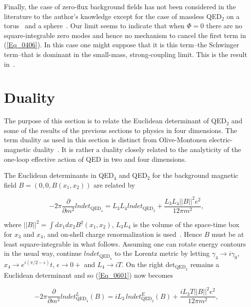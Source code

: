 \documentclass[a4paper,twocolumn,showpacs,preprintnumbers,amsmath,amssymb]{revtex4}
\newcommand{\pdo}[1]{\ensuremath{\frac{\partial }
        {\partial #1 }}}
\begin{document}
Finally, the case of zero-flux background fields has not been
considered in the literature to the author's knowledge except for the
case of massless QED$_2$ on a torus~\cite{Sachs92} and a
sphere~\cite{Jayewardena88}. Our limit seems to indicate that when
$\Phi = 0$ there are no square-integrable zero modes and hence no
mechanism to cancel the first term in (\ref{Eq_0406}).  In this case
one might suppose that it is this term--the Schwinger term--that is
dominant in the small-mass, strong-coupling limit. This is the result
in~\cite{Sachs92}.



\section{\label{Sec_SecVI}
Duality}

The purpose of this section is to relate the Euclidean determinant of
QED$_2$ and some of the results of the previous sections to physics in
four dimensions. The term duality as used in this section is distinct
from Olive-Montonen electric-magnetic duality~\cite{Montonen77}. It is
rather a duality closely related to the analyticity of the one-loop
effective action of QED in two and four dimensions.

The Euclidean determinants in QED$_4$ and QED$_2$ for the background
magnetic field $B = (0,0,B(x_1, x_2))$ are related by

\begin{widetext}
\begin{equation}
\label{Eq_0601}
-2\pi \pdo{m^2} lndet_{\text{QED}_4}
  = L_3 L_4 lndet_{\text{QED}_2}
    + \frac{L_3 L_4 ||B||^2 e^2}{12\pi m^2},
\end{equation}
\end{widetext}

\noindent
where $||B||^2 = \int dx_1 dx_2 B^2(x_1, x_2)$, $L_3 L_4$ is the
volume of the space-time box for $x_3$ and $x_4$, and on-shell charge
renormalization is used~\cite{Fry92}. Hence $B$ must be at least
square-integrable in what follows.  Assuming one can rotate energy
contours in the usual way, continue $lndet_{\text{QED}_4}$ to the
Lorentz metric by letting $\gamma_4 \to i \gamma_0$,
$x_4 \to e^{i(\pi/2 - \epsilon)}t$, $\epsilon \to 0+$ and $L_4 \to iT$.
On the right det$_{\text{QED}_2}$ remains a Euclidean determinant and
so (\ref{Eq_0601}) now becomes

\begin{widetext}
\begin{equation}
\label{Eq_0602}
-2 \pi \pdo{m^2} lndet^L_{\text{QED}_4}(B)
  = i L_3 \, lndet^E_{\text{QED}_2}(B)
    + \frac{i L_3 T ||B||^2 e^2}{12 \pi m^2},
\end{equation}
\end{widetext}
\end{document}
